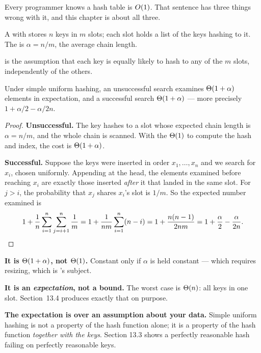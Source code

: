 Every programmer knows a hash table is $O(1)$. That sentence has three
things wrong with it, and this chapter is about all three.

\begin{definitionbox}
A  with  stores $n$ keys in $m$ slots; each
slot holds a list of the keys hashing to it. The  is
$\alpha = n/m$, the average chain length.

\smallskip
{} is the assumption that each key is equally likely
to hash to any of the $m$ slots, independently of the others.
\end{definitionbox}

\begin{theorem}\label{thm:chaining}
Under simple uniform hashing, an unsuccessful search examines
$\Theta(1+\alpha)$ elements in expectation, and a successful search
$\Theta(1+\alpha)$ --- more precisely $1 + \alpha/2 - \alpha/2n$.
\end{theorem}

\begin{proof}
\textbf{Unsuccessful.} The key hashes to a slot whose expected chain length is
$\alpha = n/m$, and the whole chain is scanned. With the $\Theta(1)$ to compute
the hash and index, the cost is $\Theta(1+\alpha)$.

\smallskip
\textbf{Successful.} Suppose the keys were inserted in order
$x_{1},\ldots,x_{n}$ and we search for $x_{i}$, chosen uniformly. Appending at
the head, the elements examined before reaching $x_{i}$ are exactly those
inserted \emph{after} it that landed in the same slot. For $j > i$, the
probability that $x_{j}$ shares $x_{i}$'s slot is $1/m$. So the expected number
examined is
\[ 1 + \frac{1}{n}\sum_{i=1}^{n}\sum_{j=i+1}^{n}\frac{1}{m}
   = 1 + \frac{1}{nm}\sum_{i=1}^{n}(n-i)
   = 1 + \frac{n(n-1)}{2nm}
   = 1 + \frac{\alpha}{2} - \frac{\alpha}{2n}. \qedhere \]
\end{proof}

\begin{alertbox}
\begin{tightnum}
  \item \textbf{It is $\Theta(1+\alpha)$, not $\Theta(1)$.} Constant only if
        $\alpha$ is held constant --- which requires resizing, which is
        's subject.
  \item \textbf{It is an \emph{expectation}, not a bound.} The worst case is
        $\Theta(n)$: all keys in one slot. Section~13.4 produces exactly that
        on purpose.
  \item \textbf{The expectation is over an assumption about your data.} Simple
        uniform hashing is not a property of the hash function alone; it is a
        property of the hash function \emph{together with the keys}. Section
        13.3 shows a perfectly reasonable hash failing on perfectly reasonable
        keys.
\end{tightnum}
\end{alertbox}


